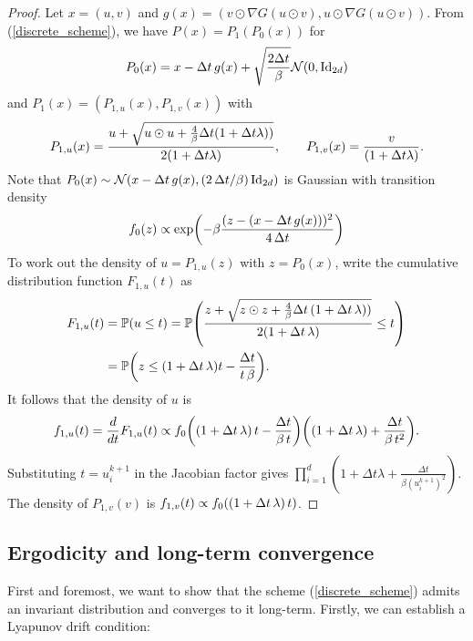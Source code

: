 \documentclass[11pt, twoside]{report}
\begin{document}
\begin{proof}
Let
$x = (u,v)$  and $g(x) = (v\odot \nabla G(u\odot v), u\odot \nabla G(u\odot v))$. From (\ref{discrete_scheme}), we have $P(x) = P_1(P_0(x))$ for
$$
P_0(x) = x - {\Delta t} \,g(x) + \sqrt{\frac{2{\Delta t}}{\beta} }\mathcal{N}(0,\mathrm{Id}_{2d})
$$
and $P_1(x)  = (P_{1,u}(x), P_{1,v}(x))$ with 
$$
P_{1,u}(x) = \frac{u + \sqrt{u\odot u + \frac{4}{\beta} {\Delta t} (1+{\Delta t} \lambda))}}{2(1+{\Delta t}\lambda)}, \qquad P_{1,v}(x) = \frac{v}{(1+{\Delta t}\lambda)}.
$$
Note that $ P_0(x) \sim\Nn\pa{x - \tstep \,g(x) , (2\,\tstep/\beta)\,\Id_{2d}  }$  is Gaussian with transition density
$$
f_0(z) \propto \exp\pa{ -\beta\frac{(z-(x-\tstep\, g(x)))^2}{4\,\tstep} }
$$
To work out the density of $u = P_{1,u}(z)$ with $z=P_0(x)$, write the  cumulative distribution function $F_{1,u}(t)$ as
\begin{align*}
    F_{1,u}(t) &= \PP(u\leq t) = \PP\pa{\frac{z + \sqrt{z\odot z + \frac{4}{\beta}\tstep\, (1+\tstep \,\lambda))}}{2(1+\tstep\,\lambda)} \leq t }\\
    &= \PP\pa{   z   \leq (1+\tstep\,\lambda) t - \frac{\tstep }{t\,\beta }}.
\end{align*}
It follows that the density of $u$ is
$$
f_{1,u}(t) = \frac{d}{dt}F_{1,u}(t) \propto f_0\pa{ (1+\tstep\,\lambda)\, t - \frac{\tstep}{\beta \,t} }  \pa{(1+\tstep\,\lambda) +  \frac{\tstep}{\beta \,t^2} }.
$$
Substituting $t = u^{k+1}_i$ in the Jacobian factor gives $\prod_{i=1}^d\left(1+\Delta t \lambda+\frac{\Delta t}{\beta\left(u_i^{k+1}\right)^2}\right)$. The density of $P_{1,v}(v)$ is
$f_{1,v}(t)\propto f_0( (1+{\Delta t}\,\lambda)\,t)$. 
\end{proof}

\subsection{Ergodicity and long-term convergence}
First and foremost, we want to show that the scheme (\ref{discrete_scheme}) admits an invariant distribution and converges to it long-term. Firstly, we can establish a Lyapunov drift condition:
\end{document}
